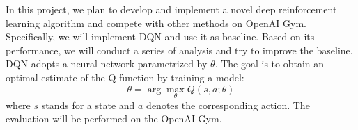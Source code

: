 
In this project, we plan to develop and implement a novel deep reinforcement learning algorithm and compete with other methods on OpenAI Gym. Specifically, we will implement DQN and use it as baseline. Based on its performance, we will conduct a series of analysis and try to improve the baseline.
%
DQN adopts a neural network parametrized by $\theta$. The goal is to obtain an optimal estimate of the Q-function by training a model:
\begin{equation*}
\theta = \arg\max_\theta Q(s,a;\theta)
\end{equation*}
where $s$ stands for a state and $a$ denotes the corresponding action. 
The evaluation will be performed on the OpenAI Gym.
